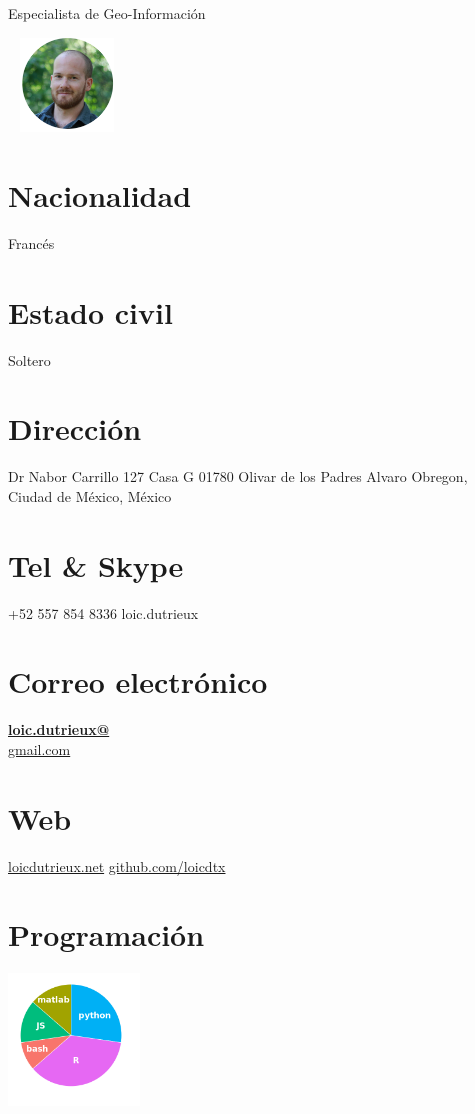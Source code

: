 \documentclass[spanish]{friggeri-cv}
\begin{document}
      {Especialista de Geo-Información}
      

\begin{aside}
    ~
    \includegraphics[width=2.5cm]{img/profile_circle_small.png}
    ~
  \section{Nacionalidad}
    Francés
    ~
  \section{Estado civil}
    Soltero
    ~
  \section{Dirección}
    Dr Nabor Carrillo 127 Casa G
    01780 Olivar de los Padres
    Alvaro Obregon, Ciudad de México, México
    ~
  \section{Tel \& Skype}
    +52 557 854 8336
    loic.dutrieux
    ~
  \section{Correo electrónico}
    \href{mailto:loic.dutrieux@gmail.com}{\textbf{loic.dutrieux@}\\gmail.com}
    ~
  \section{Web}
    \href{http://www.loicdutrieux.net}{loicdutrieux.net}
    \href{https://github.com/loicdtx}{github.com/loicdtx}
    ~
  \section{Programación}
    \includegraphics[width=3.5cm]{img/programming.png}
    ~

\end{aside}
\end{document}
